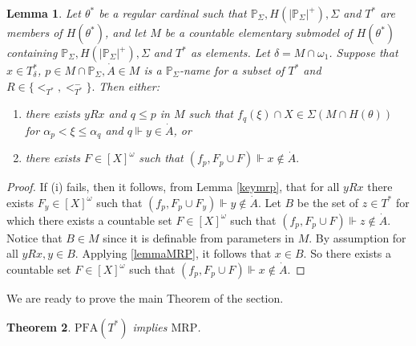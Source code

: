 \documentclass{amsart}
\newtheorem{theorem}{Theorem}[section]
\newtheorem{lemma}[theorem]{Lemma}
\theoremstyle{definition}
\newcommand{\PFA}{\mathrm{PFA}}
\newcommand{\MRP}{\mathrm{MRP}}
\begin{document}
     \begin{lemma}\label{keymrp2}
    Let $\theta^*$ be a  regular cardinal such that $\mathbb{P}_\Sigma, H(|\mathbb{P}_\Sigma|^+), \Sigma$ and $T^*$ are members of $H(\theta^*)$, and let $M$ be a countable elementary submodel of $H(\theta^*)$ containing $\mathbb{P}_\Sigma,H\left (|\mathbb{P}_\Sigma|^+\right ), \Sigma $ and $T^*$ as elements. Let $\delta=M\cap \omega_1$. Suppose that $x\in T_\delta^*$, $p\in M\cap \mathbb{P}_\Sigma, \dot A\in M $ is a $\mathbb{P}_\Sigma$-name for a subset of $T^*$ and $R\in\{<_{T^*},<_{T^*}^-\}.$  Then either:
    \begin{enumerate}

    \item[{\rm (i)}] there exists $yRx$ and $q\leq p$ in $M$ such that $f_q(\xi)\cap X\in \Sigma(M\cap H(\theta))$ for $\alpha_p<\xi\leq \alpha_q$ and $q\Vdash y\in \dot A$, or

   \item[{\rm (ii)}]  there exists $F\in [X]^\omega$ such that $(f_p, F_p\cup F)\Vdash x\notin \dot A.$
        \end{enumerate}

\end{lemma}
\begin{proof}
    If (i) fails, then it follows, from Lemma \ref{keymrp}, that for all $yRx$ there exists $F_y\in[X]^\omega$ such that $(f_p, F_p\cup F_y)\Vdash y\notin \dot A$. Let $B$ be the set of $z \in T^*$ for which there exists a countable set $F\in [X]^\omega$ such that $(f_p,F_p \cup F)\Vdash z\notin \dot A$. Notice that $B \in M$ since it is definable from parameters in $M$. By assumption for all $y R x, y \in B$. Applying \ref{lemmaMRP}, it follows that $x \in B$. So there exists a countable set $F\in [X]^\omega$  such that $(f_p, F_p \cup F) \Vdash x\notin \dot A$.
\end{proof}
We are ready to prove the main Theorem of the section.
\begin{theorem}
    $\PFA(T^*)$ implies $\MRP$.
\end{theorem}
\end{document}
